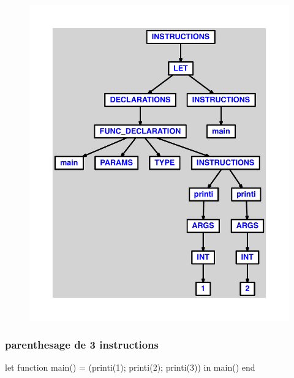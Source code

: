 \documentclass{article}
\begin{document}
\begin{figure}[H]\centering\includegraphics[max width=\textwidth]{ast/ast_136.pdf}\end{figure}\subsubsection{parenthesage de 3 instructions}
\begin{verbatimtab}
let function main() = (printi(1); printi(2); printi(3)) in main() end
\end{verbatimtab}
\end{document}
